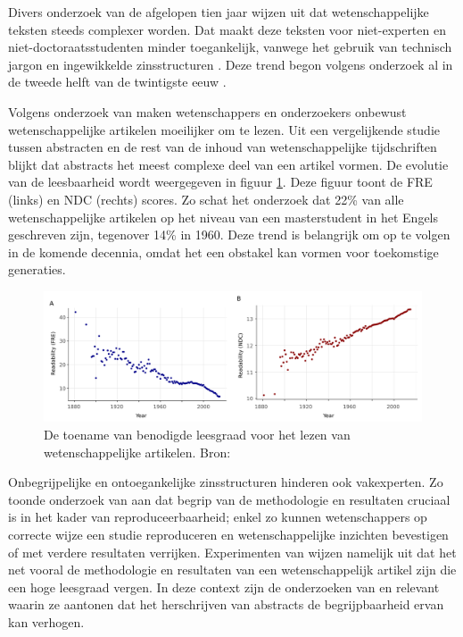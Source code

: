 Divers onderzoek van de afgelopen tien jaar wijzen uit dat wetenschappelijke teksten steeds complexer worden. Dat maakt deze teksten voor niet-experten en niet-doctoraatsstudenten minder toegankelijk, vanwege het gebruik van technisch jargon en ingewikkelde zinsstructuren \autocite{Ball2017, PlavenSigray2017, Jones2019}. Deze trend begon volgens onderzoek al in de tweede helft van de twintigste eeuw \autocite{Hayes1992}.

\medspace

Volgens onderzoek van \textcite{PlavenSigray2017} maken wetenschappers en onderzoekers onbewust wetenschappelijke artikelen moeilijker om te lezen. Uit een vergelijkende studie tussen abstracten en de rest van de inhoud van wetenschappelijke tijdschriften blijkt dat abstracts het meest complexe deel van een artikel vormen. De evolutie van de leesbaarheid wordt weergegeven in figuur \ref{img:fre-ndc}. Deze figuur toont de FRE (links) en NDC (rechts) scores. Zo schat het onderzoek dat 22\% van alle wetenschappelijke artikelen op het niveau van een masterstudent in het Engels geschreven zijn, tegenover 14\% in 1960. Deze trend is belangrijk om op te volgen in de komende decennia, omdat het een obstakel kan vormen voor toekomstige generaties.

\begin{figure}[H]
	\includegraphics[width=\linewidth]{img/fre-ndc.png}
	\caption{De toename van benodigde leesgraad voor het lezen van wetenschappelijke artikelen. Bron: \autocite{PlavenSigray2017}}
	\label{img:fre-ndc}
\end{figure}

Onbegrijpelijke en ontoegankelijke zinsstructuren hinderen ook vakexperten. Zo toonde onderzoek van \textcite{McNutt2014} aan dat begrip van de methodologie en resultaten cruciaal is in het kader van reproduceerbaarheid; enkel zo kunnen wetenschappers op correcte wijze een studie reproduceren en wetenschappelijke inzichten bevestigen of met verdere resultaten verrijken. Experimenten van \textcite{Hubbard2017} wijzen namelijk uit dat het net vooral de methodologie en resultaten van een wetenschappelijk artikel zijn die een hoge leesgraad vergen. In deze context zijn de onderzoeken van \textcite{Hartley1999} en \textcite{Snow2010} relevant waarin ze aantonen dat het herschrijven van abstracts de begrijpbaarheid ervan kan verhogen.

